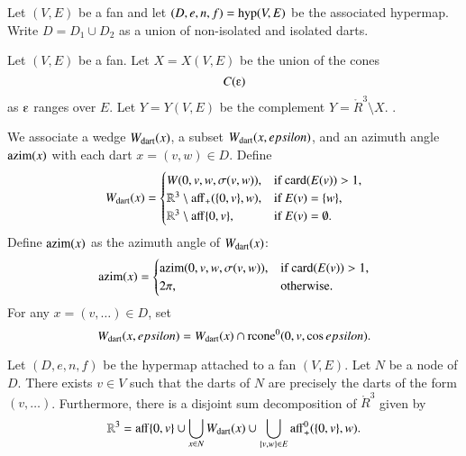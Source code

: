 Let $(V,E)$ be a fan and let $(D,e,n,f) = {\operatorname{hyp}}(V,E)$
be the associated hypermap.  Write $D = D_1\cup D_2$ as a union of
non-isolated and isolated darts.

\begin{definition}[X,~Y]\label{def:XY}
Let $(V,E)$ be a fan.  Let $X=X(V,E)$ be the union of the
cones
   $$C(\e)$$
as $\e$ ranges over $E$.  Let $Y=Y(V,E)$ be the complement
$Y = \ring{R}^3\setminus X$.
.
\end{definition}


We associate a wedge $W_{\text{dart}}(x)$, a subset $W_{\text{dart}}(x,epsilon)$,
and an azimuth angle ${\operatorname{azim}}(x)$
with each dart $x=(v,w)\in D$.  Define 
$$
W_{\text{dart}}(x)=
\begin{cases} 
W(0,v,w,\sigma(v,w)),&\text{if }{\operatorname{card}}(E(v))>1,\\
\mathbb{R}^3\setminus {\operatorname{aff}}_+(\{0,v\},w),&\text{if } E(v) = \{w\},\\
\mathbb{R}^3\setminus {\operatorname{aff}}\{0,v\},&\text{if } E(v) = \emptyset.\\
\end{cases}
$$
Define ${\operatorname{azim}}(x)$ as the azimuth angle of $W_{\text{dart}}(x)$:
$$
{\operatorname{azim}}(x)=\begin{cases}
{\operatorname{azim}}(0,v,w,\sigma(v,w)), &\text{if } {\operatorname{card}}(E(v)) > 1,\\
2\pi, & \text{otherwise.}\\
\end{cases}
$$
For any $x = (v,\ldots)\in D$, set
    $$
    W_{\text{dart}}(x,epsilon) = W_{\text{dart}}(x) \cap {\operatorname{rcone}}^0(0,v,\cos epsilon).
    $$



\begin{lemma}
Let $(D,e,n,f)$ be the hypermap attached to a 
fan $(V,E)$.
Let $N$ be a node of $D$.  There exists $v\in V$
such that the darts of $N$ are precisely
the darts of the form $(v,\ldots)$.  Furthermore, there is a 
disjoint sum decomposition of $\ring{R}^3$ given by
  $$
  \mathbb{R}^3 = 
  {\operatorname{aff}}\{0,v\} \cup
  \bigcup_{x\in N} W_{\text{dart}}(x)  \cup 
  \bigcup_{\{v,w\}\in E} {\operatorname{aff}}_+^0(\{0,v\},w).
  $$
\end{lemma}

